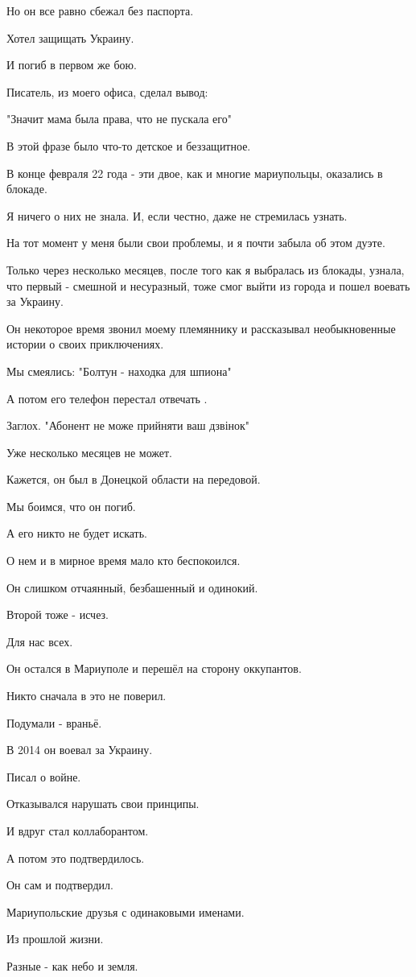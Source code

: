 Но он все равно сбежал   без паспорта.  

Хотел защищать Украину. 

И погиб в первом же бою. 

Писатель,  из моего офиса,  сделал вывод: 

"Значит мама была права, что не пускала его"

В этой фразе  было что-то детское и беззащитное. 

 В конце февраля 22 года  - эти двое, как и многие мариупольцы,  оказались в
 блокаде. 

Я ничего о них не знала. И, если честно, даже не стремилась узнать.  

На тот момент у меня были свои проблемы, и я почти забыла об этом дуэте. 

Только через несколько месяцев, после того как я выбралась из блокады, узнала,
что первый - смешной и несуразный, тоже смог  выйти  из города и пошел воевать
за Украину. 

Он некоторое время звонил моему племяннику и  рассказывал необыкновенные
истории о своих приключениях. 

Мы смеялись: "Болтун - находка для шпиона"

А потом его телефон перестал отвечать . 

Заглох. "Абонент не може прийняти ваш дзвінок"

Уже несколько месяцев не может. 

Кажется, он  был в Донецкой области на передовой. 

Мы боимся, что он погиб. 

А его никто не будет искать. 

О нем и в мирное время мало кто беспокоился. 

Он слишком отчаянный,  безбашенный и одинокий. 

Второй тоже - исчез. 

Для нас всех. 

Он остался в Мариуполе и перешёл на сторону оккупантов. 

Никто сначала в это не поверил. 

Подумали - враньё. 

В 2014 он воевал за Украину. 

Писал о войне. 

Отказывался нарушать свои принципы. 

И вдруг стал коллаборантом. 

А потом это  подтвердилось.  

Он сам и подтвердил. 

Мариупольские друзья с одинаковыми именами.   

Из прошлой жизни. 

Разные - как небо и земля.
